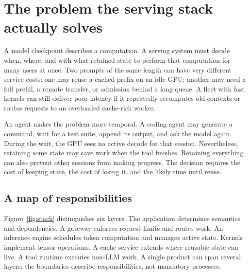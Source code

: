 \section{The problem the serving stack actually solves}
\label{sec:orientation}
A model checkpoint describes a computation. A serving system must decide when,
where, and with what retained state to perform that computation for many users
at once. Two prompts of the same length can have very different service costs:
one may reuse a cached prefix on an idle GPU; another may need a full prefill,
a remote transfer, or admission behind a long queue. A fleet with fast kernels
can still deliver poor latency if it repeatedly recomputes old contexts or
routes requests to an overloaded cache-rich worker.

An agent makes the problem more temporal. A coding agent may generate a command,
wait for a test suite, append its output, and ask the model again. During the
wait, the GPU sees no active decode for that session. Nevertheless, retaining
some state may save work when the tool finishes. Retaining everything can also
prevent other sessions from making progress. The decision requires the cost of
keeping state, the cost of losing it, and the likely time until reuse.

\subsection{A map of responsibilities}
Figure~\ref{fig:stack} distinguishes six layers. The application determines
semantics and dependencies. A gateway enforces request limits and routes work.
An inference engine schedules token computation and manages active state.
Kernels implement tensor operations. A cache service extends where reusable
state can live. A tool runtime executes non-LLM work. A single product can span
several layers; the boundaries describe responsibilities, not mandatory processes.


